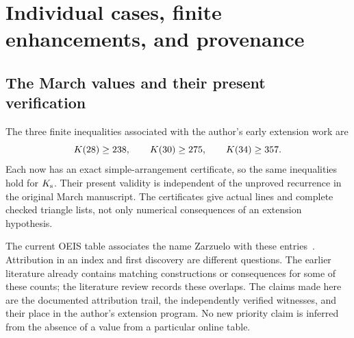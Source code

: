 \section{Individual cases, finite enhancements, and provenance}\label{sec:finite}

\subsection{The March values and their present verification}

The three finite inequalities associated with the author's early extension work are
\begin{equation}\label{eq:march-three}
K(28)\ge238,\qquad K(30)\ge275,\qquad K(34)\ge357.
\end{equation}
Each now has an exact simple-arrangement certificate, so the same inequalities hold for $K_{\mathrm{s}}$. Their present validity is independent of the unproved recurrence in the original March manuscript. The certificates give actual lines and complete checked triangle lists, not only numerical consequences of an extension hypothesis.

The current OEIS table associates the name Zarzuelo with these entries~\cite{oeisA006066,zarzuelo2026}. Attribution in an index and first discovery are different questions. The earlier literature already contains matching constructions or consequences for some of these counts; the literature review records these overlaps. The claims made here are the documented attribution trail, the independently verified witnesses, and their place in the author's extension program. No new priority claim is inferred from the absence of a value from a particular online table.

